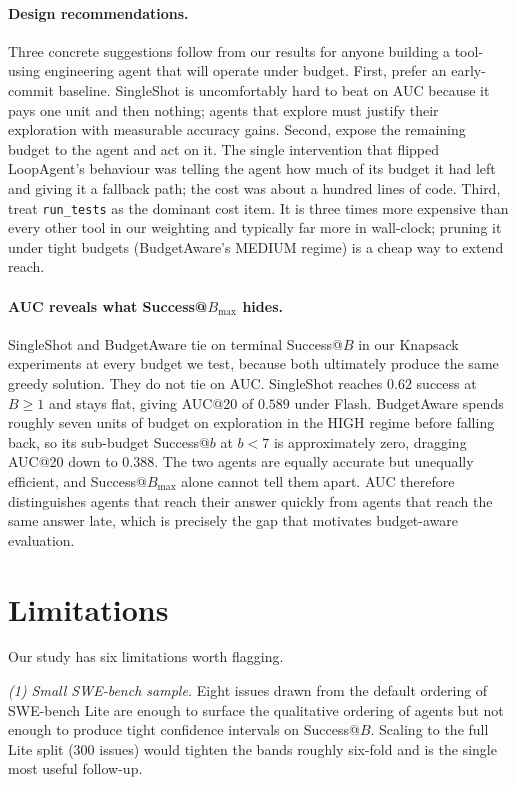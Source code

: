 \documentclass[11pt]{article}
\begin{document}
\paragraph{Design recommendations.}
Three concrete suggestions follow from our results for anyone building
a tool-using engineering agent that will operate under budget. First,
prefer an early-commit baseline. SingleShot is uncomfortably hard to
beat on AUC because it pays one unit and then nothing; agents that
explore must justify their exploration with measurable accuracy gains.
Second, expose the remaining budget to the agent and act on it. The
single intervention that flipped LoopAgent's behaviour was telling
the agent how much of its budget it had left and giving it a
fallback path; the cost was about a hundred lines of code. Third,
treat \texttt{run\_tests} as the dominant cost item. It is three
times more expensive than every other tool in our weighting and
typically far more in wall-clock; pruning it under tight budgets
(BudgetAware's MEDIUM regime) is a cheap way to extend reach.

\paragraph{AUC reveals what Success@$B_\text{max}$ hides.}
SingleShot and BudgetAware tie on terminal Success@$B$ in our
Knapsack experiments at every budget we test, because both ultimately
produce the same greedy solution. They do not tie on AUC. SingleShot
reaches $0.62$ success at $B \ge 1$ and stays flat, giving AUC@20 of
$0.589$ under Flash. BudgetAware spends roughly seven units of budget
on exploration in the HIGH regime before falling back, so its
sub-budget Success@$b$ at $b < 7$ is approximately zero, dragging
AUC@20 down to $0.388$. The two agents are equally accurate but
unequally efficient, and Success@$B_\text{max}$ alone cannot tell them
apart. AUC therefore distinguishes agents that reach their answer
quickly from agents that reach the same answer late, which is
precisely the gap that motivates budget-aware evaluation.

\section{Limitations}
\label{sec:limitations}

Our study has six limitations worth flagging.

\textit{(1) Small SWE-bench sample.} Eight issues drawn from the
default ordering of SWE-bench Lite are enough to surface the
qualitative ordering of agents but not enough to produce tight
confidence intervals on Success@$B$. Scaling to the full Lite split
(300 issues) would tighten the bands roughly six-fold and is the
single most useful follow-up.
\end{document}
